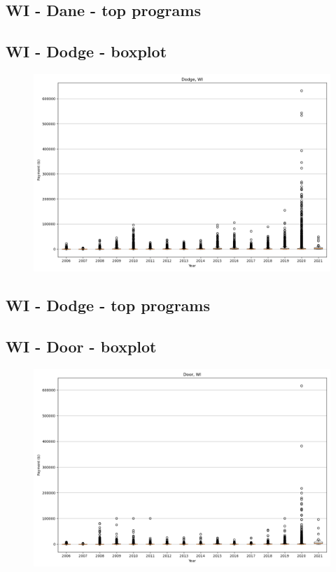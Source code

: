 \subsection*{WI - Dane - top programs}

\newpage
\subsection*{WI - Dodge - boxplot}
\begin{figure}[h]
\centering
\includegraphics[width=7in]{../output/boxplots/counties/Dodge-WI_boxplot.png}
\end{figure}


\subsection*{WI - Dodge - top programs}

\newpage
\subsection*{WI - Door - boxplot}
\begin{figure}[h]
\centering
\includegraphics[width=7in]{../output/boxplots/counties/Door-WI_boxplot.png}
\end{figure}


